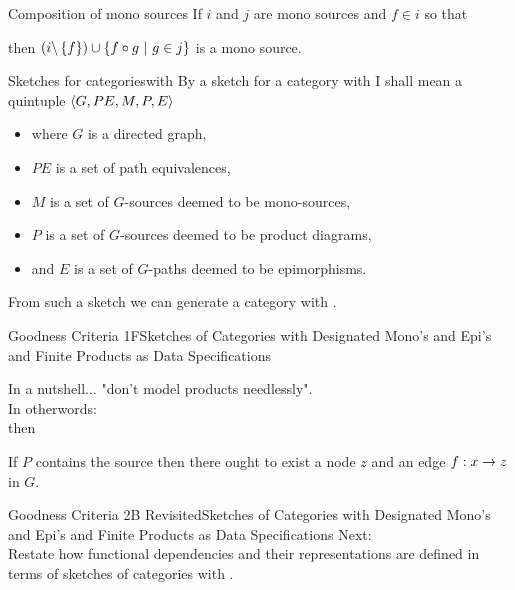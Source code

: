 

\renewcommand{\slidecontext}{Sketches of Categories with Designated Mono's and Epi's and Finite Products as Data Specifications}

\begin{frame}{Composition of mono sources}
If $i$ and $j$ are mono sources and $f \in i$ so that
\begin{center}
\scalebox{0.65}{

}
\end{center}
then $(i \backslash \left\{f\right\}) \cup \left\{f \circ g \ \middle|\ g \in j\right\}$ is a mono source.
\end{frame}

\begin{frame}{Sketches for categories}{with \thirdstructure }
By a sketch for a category with \thirdstructure I shall mean a quintuple
$\langle G,PE,M,P,E\rangle$
\begin{itemize}
\item  where $G$ is a directed graph, 
\item  $PE$ is a set of path equivalences, 
\item  $M$ is a set of $G$-sources deemed to be mono-sources,
\item  $P$ is a set of $G$-sources deemed to be product diagrams, 
\item  and $E$ is a set of $G$-paths deemed to be epimorphisms.
\end{itemize}
\medskip
From such a sketch we can generate a category with \thirdstructure.  
\end{frame}

\begin{frame}{Goodness Criteria 1F}{\slidecontext}

In  a nutshell... "don't model products needlessly".\\

\pause In otherwords:\\
\medskip
\IfSforproductepimonoCwithRCwords then

 If $P$ contains the source  
then there ought to exist a node $z$ and an edge $f: x \rightarrow z$ in $G$.
\end{frame}

\iffalse
\begin{frame}{Goodness Criteria 2B Revisited}{\slidecontext}
Next:\\
Restate how functional dependencies and their representations are defined in terms of sketches of categories with \thirdstructure.
\end{frame}

